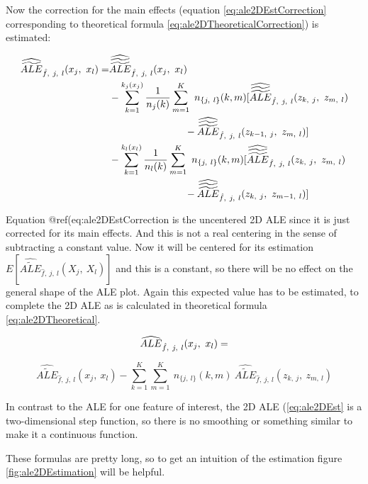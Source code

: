 \documentclass[
]{krantz}
\begin{document}
Now the correction for the main effects (equation \eqref{eq:ale2DEstCorrection} corresponding to theoretical formula \eqref{eq:ale2DTheoreticalCorrection}) is estimated:

\begin{align}
\widehat{\widetilde{ALE}}_{\hat{f},~j,~l}(x_j, ~x_l) = 
&\widehat{\widetilde{\widetilde{ALE}}}_{\hat{f},~j,~l}(x_j, ~x_l) \notag \\
&-  \sum_{k=1}^{k_j(x_j)} \frac{1}{n_j(k)} \sum_{m=1}^{K} ~ n_{\{j,~l\}}(k,m) [\widehat{\widetilde{\widetilde{ALE}}}_{\hat{f},~j,~l}(z_{k,~j}, ~z_{m,~l}) \notag \\
&~~~~~~~~~~~~~~~~~~~~~~~
- \widehat{\widetilde{\widetilde{ALE}}}_{\hat{f},~j,~l}(z_{k-1,~j}, ~z_{m,~l})]\notag \\
&- \sum_{k=1}^{k_l(x_l)} \frac{1}{n_l(k)} \sum_{m=1}^{K} ~ n_{\{j,~l\}}(k,m) [\widehat{\widetilde{\widetilde{ALE}}}_{\hat{f},~j,~l}(z_{k,~j}, ~z_{m,~l}) \notag \\
&~~~~~~~~~~~~~~~~~~~~~~~ 
- \widehat{\widetilde{\widetilde{ALE}}}_{\hat{f},~j,~l}(z_{k,~j}, ~z_{m-1,~l})]
\label{eq:ale2DEstCorrection}
\end{align}

Equation @ref(eq:ale2DEstCorrection is the uncentered 2D ALE since it is just corrected for its main effects. And this is not a real centering in the sense of subtracting a constant value. Now it will be centered for its estimation \(E[\widehat{\widetilde{ALE}}_{\hat{f},~j,~l}(X_j, ~X_l)]\) and this is a constant, so there will be no effect on the general shape of the ALE plot. Again this expected value has to be estimated, to complete the 2D ALE as is calculated in theoretical formula \eqref{eq:ale2DTheoretical}.

\begin{equation}  
\widehat{ALE}_{\hat{f},~j,~l}(x_j, ~x_l) = \notag
\end{equation}

\begin{equation}
\widehat{\widetilde{ALE}}_{\hat{f},~j,~l}(x_j, ~x_l) -
\sum_{k=1}^{K}\sum_{m=1}^{K} ~ n_{\{j,~l\}}(k,m) ~ \widehat{\widetilde{ALE}}_{\hat{f},~j,~l}(z_{k,~j}, ~z_{m,~l}) 
 \label{eq:ale2DEst}
\end{equation}

In contrast to the ALE for one feature of interest, the 2D ALE (\eqref{eq:ale2DEst} is a two-dimensional step function, so there is no smoothing or something similar to make it a continuous function.

These formulas are pretty long, so to get an intuition of the estimation figure \ref{fig:ale2DEstimation} will be helpful.
\end{document}
